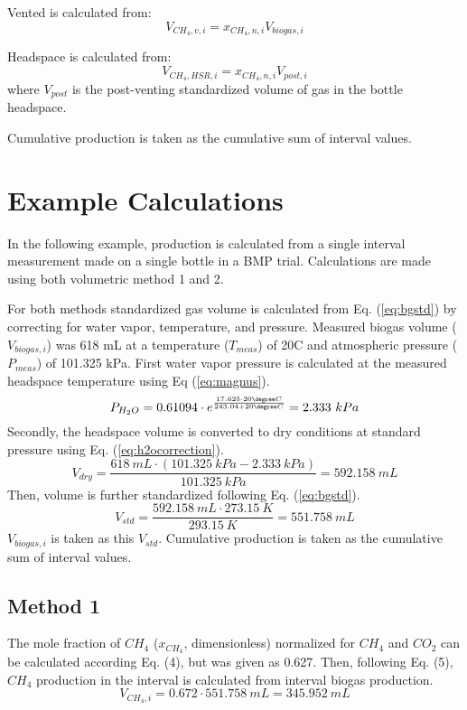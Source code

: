 \documentclass[]{article}
\begin{document}
Vented  is calculated from:
\begin{equation}
  V_{CH_4, v, i} = x_{CH_4, n, i} V_{biogas, i}
\end{equation}

Headspace  is calculated from:
\begin{equation}
  V_{CH_4, HSR, i} = x_{CH_4, n, i} V_{post, i}
\end{equation}
where $V_{post}$ is the post-venting standardized volume of gas in the bottle headspace.

Cumulative production is taken as the cumulative sum of interval values. 

\section{Example Calculations}
In the following example,  production is calculated from a single interval measurement made on a single bottle in a BMP trial. Calculations are made using both volumetric method 1 and 2. 

For both methods standardized gas volume is calculated from Eq. (\ref{eq:bgstd}) by correcting for water vapor, temperature, and pressure. Measured biogas volume ($V_{biogas,i}$) was 618 mL at a temperature ($T_{meas}$) of 20\degree C and atmospheric pressure ($P_{meas}$) of 101.325 kPa.  
First water vapor pressure is calculated at the measured headspace temperature using Eq (\ref{eq:magnus}).
\begin{equation*}
   P_{H_2O} = 0.61094 \cdot e^{\frac{17.625 \cdot 20 \degree C}{243.04 + 20 \degree C}} = 2.333\ kPa
\end{equation*}
Secondly, the headspace volume is converted to dry conditions at standard pressure using Eq. (\ref{eq:h2ocorrection}).
\begin{equation*}
   V_{dry} = \frac{618\ mL \cdot (101.325\ kPa - 2.333\ kPa)}{101.325\ kPa} = 592.158\ mL  
\end{equation*}
Then, volume is further standardized following Eq. (\ref{eq:bgstd}).
\begin{equation*}
    V_{std} = \frac{592.158\ mL \cdot 273.15\ K}{293.15\ K} = 551.758\ mL  
\end{equation*}
$V_{biogas,i}$ is taken as this $V_{std}$. Cumulative production is taken as the cumulative sum of interval values.
\subsection{Method 1}
The mole fraction of $CH_{4}$ ($x_{CH_4}$, dimensionless) normalized for $CH_{4}$ and $CO_{2}$ can be calculated according Eq. (4), but was given as 0.627. 
Then, following Eq. (5), $CH_{4}$ production in the interval is calculated from interval biogas production.
\begin{equation*}
  V_{CH_4, i} = 0.672 \cdot 551.758\ mL  = 345.952\ mL 
\end{equation*}
\end{document}
